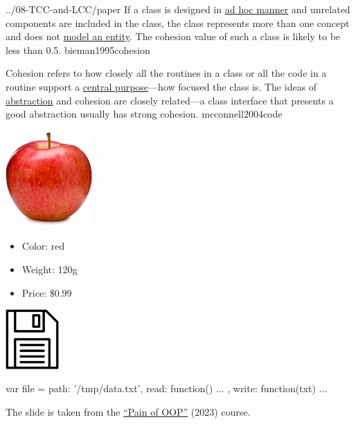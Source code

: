 \documentclass{article}
\begin{document}
\lnQuote
  {../08-TCC-and-LCC/paper}
  {If a class is designed in \ul{ad hoc manner} and unrelated components are included in the class, the class represents more than one concept and does not \ul{model an entity}. The cohesion value of such a class is likely to be less than 0.5.}
  {bieman1995cohesion}

  {Cohesion refers to how closely all the routines in a class or all the code in a routine support a \ul{central purpose}---how focused the class is. The ideas of \ul{abstraction} and cohesion are closely related---a class interface that presents a good abstraction usually has strong cohesion.}
  {mcconnell2004code}

\begin{multicols}{2}
\includegraphics[width=1.3in]{apple.jpg}
\begin{itemize}\setlength\itemsep{0em}
\item Color: red
\item Weight: 120g
\item Price: \$0.99
\end{itemize}
\par\columnbreak\par
\includegraphics[width=0.8in]{file-on-disc.jpg}
\par
{\small\begin{ffcode}
var file = {
  path: '/tmp/data.txt',
  read: function() { ... },
  write: function(txt) { ... }
}
\end{ffcode}
}
\end{multicols}
\par
{\scriptsize The slide is taken from the \href{https://github.com/yegor256/painofoop}{``Pain of OOP''} (2023) course.\par}
\plush{}
\end{document}
